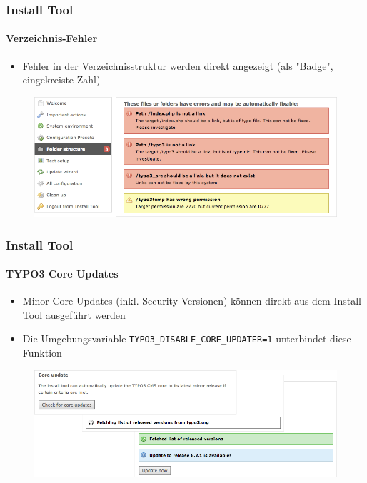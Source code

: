 
\begin{frame}[fragile]
	\frametitle{Install Tool}
	\framesubtitle{Verzeichnis-Fehler}

	\begin{itemize}
		\item Fehler in der Verzeichnisstruktur werden direkt angezeigt\newline
			(als "Badge", eingekreiste Zahl)
	\end{itemize}

	\begin{figure}
		\includegraphics[width=0.95\linewidth]{Images/InstallTool/ErrorsInFolderStructure.png}
	\end{figure}

\end{frame}


\begin{frame}[fragile]
	\frametitle{Install Tool}
	\framesubtitle{TYPO3 Core Updates}

	\begin{itemize}
		\item Minor-Core-Updates (inkl. Security-Versionen) können direkt aus dem Install Tool ausgeführt werden
		\item Die Umgebungsvariable \texttt{TYPO3\_DISABLE\_CORE\_UPDATER=1} unterbindet diese Funktion
	\end{itemize}

	\begin{figure}
		\includegraphics[width=0.9\linewidth]{Images/InstallTool/CoreUpdate.png}
	\end{figure}

\end{frame}

